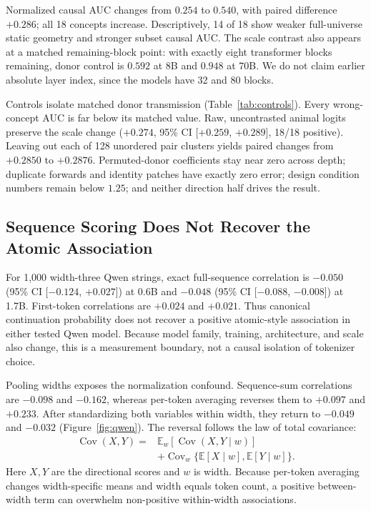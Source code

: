 \documentclass[letterpaper]{article}
\newcommand{\CI}[2]{95\% CI [#1, #2]}
\begin{document}
Normalized causal AUC changes from $0.254$ to $0.540$, with paired difference
$+0.286$; all 18 concepts increase. Descriptively, 14 of 18 show weaker
full-universe static geometry and stronger subset causal AUC. The scale contrast also appears at a
matched remaining-block point: with exactly eight transformer blocks remaining,
donor control is $0.592$ at 8B and $0.948$ at 70B. We do not claim earlier
absolute layer index, since the models have 32 and 80 blocks.

Controls isolate matched donor transmission (Table~\ref{tab:controls}). Every
wrong-concept AUC is far below its matched value. Raw, uncontrasted animal
logits preserve the scale change ($+0.274$, \CI{$+0.259$}{$+0.289$}, 18/18
positive). Leaving out each of
128 unordered pair clusters yields paired changes from $+0.2850$ to $+0.2876$.
Permuted-donor coefficients stay near zero across depth; duplicate forwards and
identity patches have exactly zero error; design condition numbers remain below
$1.25$; and neither direction half drives the result.

\subsection{Sequence Scoring Does Not Recover the Atomic Association}

For 1,000 width-three Qwen strings, exact full-sequence correlation is $-0.050$
(\CI{$-0.124$}{$+0.027$}) at 0.6B and $-0.048$
(\CI{$-0.088$}{$-0.008$}) at 1.7B. First-token correlations are $+0.024$ and
$+0.021$. Thus canonical continuation probability does not recover a positive
atomic-style association in either tested Qwen model. Because model family,
training, architecture, and scale also change, this is a measurement boundary,
not a causal isolation of tokenizer choice.

Pooling widths exposes the normalization confound. Sequence-sum correlations are
$-0.098$ and $-0.162$, whereas per-token averaging reverses them to $+0.097$
and $+0.233$. After standardizing both variables within width, they return to
$-0.049$ and $-0.032$ (Figure~\ref{fig:qwen}). The reversal follows the law of
total covariance:
\begin{align}
\operatorname{Cov}(X,Y)={}&\mathbb{E}_w[\operatorname{Cov}(X,Y\mid w)]\nonumber\\
&+\operatorname{Cov}_w\{\mathbb{E}[X\mid w],\mathbb{E}[Y\mid w]\}.
\end{align}
Here $X,Y$ are the directional scores and $w$ is width. Because per-token
averaging changes width-specific means and width equals token count, a positive
between-width term can overwhelm non-positive within-width associations.
\end{document}
